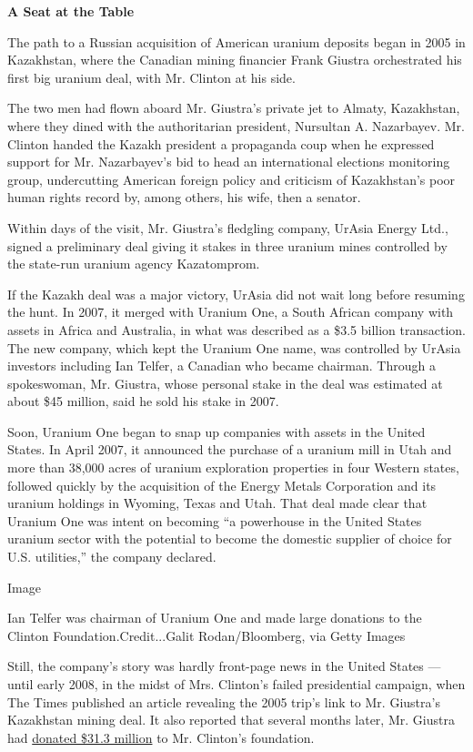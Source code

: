 \textbf{A Seat at the Table}

The path to a Russian acquisition of American uranium deposits began in
2005 in Kazakhstan, where the Canadian mining financier Frank Giustra
orchestrated his first big uranium deal, with Mr. Clinton at his side.

The two men had flown aboard Mr. Giustra's private jet to Almaty,
Kazakhstan, where they dined with the authoritarian president, Nursultan
A. Nazarbayev. Mr. Clinton handed the Kazakh president a propaganda coup
when he expressed support for Mr. Nazarbayev's bid to head an
international elections monitoring group, undercutting American foreign
policy and criticism of Kazakhstan's poor human rights record by, among
others, his wife, then a senator.

Within days of the visit, Mr. Giustra's fledgling company, UrAsia Energy
Ltd., signed a preliminary deal giving it stakes in three uranium mines
controlled by the state-run uranium agency Kazatomprom.

If the Kazakh deal was a major victory, UrAsia did not wait long before
resuming the hunt. In 2007, it merged with Uranium One, a South African
company with assets in Africa and Australia, in what was described as a
\$3.5 billion transaction. The new company, which kept the Uranium One
name, was controlled by UrAsia investors including Ian Telfer, a
Canadian who became chairman. Through a spokeswoman, Mr. Giustra, whose
personal stake in the deal was estimated at about \$45 million, said he
sold his stake in 2007.

Soon, Uranium One began to snap up companies with assets in the United
States. In April 2007, it announced the purchase of a uranium mill in
Utah and more than 38,000 acres of uranium exploration properties in
four Western states, followed quickly by the acquisition of the Energy
Metals Corporation and its uranium holdings in Wyoming, Texas and Utah.
That deal made clear that Uranium One was intent on becoming ``a
powerhouse in the United States uranium sector with the potential to
become the domestic supplier of choice for U.S. utilities,'' the company
declared.

Image

Ian Telfer was chairman of Uranium One and made large donations to the
Clinton Foundation.Credit...Galit Rodan/Bloomberg, via Getty Images

Still, the company's story was hardly front-page news in the United
States --- until early 2008, in the midst of Mrs. Clinton's failed
presidential campaign, when The Times published an article revealing the
2005 trip's link to Mr. Giustra's Kazakhstan mining deal. It also
reported that several months later, Mr. Giustra had
\href{http://www.nytimes.com/2008/01/31/us/politics/31donor.html}{donated
\$31.3 million} to Mr. Clinton's foundation.

